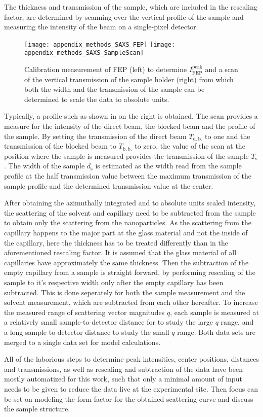 \documentclass[\main/dresen_thesis.tex]{subfiles}
\begin{document}
    The thickness and transmission of the sample, which are included in the rescaling factor, are determined by scanning over the vertical profile of the sample and measuring the intensity of the beam on a single-pixel detector.
    \begin{figure}[tb]
      \centering
      \texttt{[image: appendix\_methods\_SAXS\_FEP]}
      \texttt{[image: appendix\_methods\_SAXS\_SampleScan]}
      \caption{\label{fig:appendix:methods:saxs:fep_scan}Calibration measurement of FEP (left) to determine $I_\mathrm{FEP}^\mathrm{peak}$ and a scan of the vertical transmission of the sample holder (right) from which both the width and the transmission of the sample can be determined to scale the data to absolute units.}
    \end{figure}
    Typically, a profile such as shown in  on the right is obtained.
    The scan provides a measure for the intensity of the direct beam, the blocked beam and the profile of the sample.
    By setting the transmission of the direct beam $T_\mathrm{d.\,b.}$ to one and the transmission of the blocked beam to $T_\mathrm{b.\,b.}$ to zero, the value of the scan at the position where the sample is measured provides the transmission of the sample $T_\mathrm{s}$.
    The width of the sample $d_\mathrm{s}$ is estimated as the width read from the sample profile at the half transmission value between the maximum transmission of the sample profile and the determined transmission value at the center.

    After obtaining the azimuthally integrated and to absolute units scaled intensity, the scattering of the solvent and capillary need to be subtracted from the sample to obtain only the scattering from the nanoparticles.
    As the scattering from the capillary happens to the major part at the glass material and not the inside of the capillary, here the thickness has to be treated differently than in the aforementioned rescaling factor.
    It is assumed that the glass material of all capillaries have approximately the same thickness.
    Then the subtraction of the empty capillary from a sample is straight forward, by performing rescaling of the sample to it's respective width only after the empty capillary has been subtracted.
    This is done seperately for both the sample measurement and the solvent measurement, which are subtracted from each other hereafter.
    To increase the measured range of scattering vector magnitudes $q$, each sample is measured at a relatively small sample-to-detector distance for to study the large $q$ range, and a long sample-to-detector distance to study the small $q$ range.
    Both data sets are merged to a single data set for model calculations.

    All of the laborious steps to determine peak intensities, center positions, distances and transmissions, as well as rescaling and subtraction of the data have been mostly automatized for this work, such that only a minimal amount of input needs to be given to reduce the data live at the experimental site.
    Then focus can be set on modeling the form factor for the obtained scattering curve and discuss the sample structure.
\end{document}
